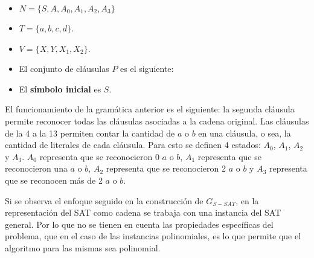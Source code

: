\documentclass{article}
\begin{document}
\begin{itemize}
    \item $N=\{S,A,A_0,A_1,A_2,A_3\}$
    \item $T=\{a,b,c,d\}$.
    \item $V=\{X,Y,X_1,X_2\}$.
    \item El conjunto de cláusulas $P$ es el siguiente:
          \begin{enumerate}
          \end{enumerate}
    \item El \textbf{símbolo inicial} es $S$.
\end{itemize}

El funcionamiento de la gramática anterior es el siguiente: la segunda cláusula permite reconocer todas las
cláusulas asociadas a la cadena original. Las cláusulas de la 4 a la 13 permiten contar la cantidad de $a$ o $b$ en
una cláusula, o sea, la cantidad de literales de cada cláusula. Para esto se definen 4 estados: $A_0$, $A_1$, $A_2$ y $A_3$.
$A_0$ representa que se reconocieron 0 $a$ o $b$, $A_1$ representa que se reconocieron una $a$ o $b$, $A_2$
representa que se reconocieron 2 $a$ o $b$ y  $A_3$ representa que se reconocen más de 2 $a$ o $b$.

Si se observa el enfoque seguido en la construcción de $G_{S-SAT}$, en la representación del SAT como cadena se trabaja con una instancia del SAT general. Por lo que no se tienen en cuenta las propiedades específicas del problema, que en el caso de las instancias polinomiales, es lo que permite que el algoritmo para las mismas sea polinomial.
\end{document}
